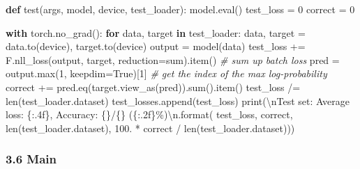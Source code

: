 \documentclass[
]{article}
\newenvironment{Shaded}{}{}
\newcommand{\BuiltInTok}[1]{#1}
\newcommand{\CharTok}[1]{\textcolor[rgb]{0.25,0.44,0.63}{#1}}
\newcommand{\CommentTok}[1]{\textcolor[rgb]{0.38,0.63,0.69}{\textit{#1}}}
\newcommand{\ControlFlowTok}[1]{\textcolor[rgb]{0.00,0.44,0.13}{\textbf{#1}}}
\newcommand{\DecValTok}[1]{\textcolor[rgb]{0.25,0.63,0.44}{#1}}
\newcommand{\FloatTok}[1]{\textcolor[rgb]{0.25,0.63,0.44}{#1}}
\newcommand{\KeywordTok}[1]{\textcolor[rgb]{0.00,0.44,0.13}{\textbf{#1}}}
\newcommand{\NormalTok}[1]{#1}
\newcommand{\OperatorTok}[1]{\textcolor[rgb]{0.40,0.40,0.40}{#1}}
\newcommand{\SpecialCharTok}[1]{\textcolor[rgb]{0.25,0.44,0.63}{#1}}
\newcommand{\StringTok}[1]{\textcolor[rgb]{0.25,0.44,0.63}{#1}}
\newcommand{\VariableTok}[1]{\textcolor[rgb]{0.10,0.09,0.49}{#1}}
\begin{document}
\begin{Shaded}
\begin{Highlighting}[]
\KeywordTok{def}\NormalTok{ test(args, model, device, test\_loader):}
\NormalTok{    model.}\BuiltInTok{eval}\NormalTok{()}
\NormalTok{    test\_loss }\OperatorTok{=} \DecValTok{0}
\NormalTok{    correct }\OperatorTok{=} \DecValTok{0}

    \ControlFlowTok{with}\NormalTok{ torch.no\_grad():}
        \ControlFlowTok{for}\NormalTok{ data, target }\KeywordTok{in}\NormalTok{ test\_loader:}
\NormalTok{            data, target }\OperatorTok{=}\NormalTok{ data.to(device), target.to(device)}
\NormalTok{            output }\OperatorTok{=}\NormalTok{ model(data)}
\NormalTok{            test\_loss }\OperatorTok{+=}\NormalTok{ F.nll\_loss(output, target, reduction}\OperatorTok{=}\StringTok{\textquotesingle{}sum\textquotesingle{}}\NormalTok{).item() }\CommentTok{\# sum up batch loss}
\NormalTok{            pred }\OperatorTok{=}\NormalTok{ output.}\BuiltInTok{max}\NormalTok{(}\DecValTok{1}\NormalTok{, keepdim}\OperatorTok{=}\VariableTok{True}\NormalTok{)[}\DecValTok{1}\NormalTok{] }\CommentTok{\# get the index of the max log{-}probability}
\NormalTok{            correct }\OperatorTok{+=}\NormalTok{ pred.eq(target.view\_as(pred)).}\BuiltInTok{sum}\NormalTok{().item()}
\NormalTok{    test\_loss }\OperatorTok{/=} \BuiltInTok{len}\NormalTok{(test\_loader.dataset)}
\NormalTok{    test\_losses.append(test\_loss)}
    \BuiltInTok{print}\NormalTok{(}\StringTok{\textquotesingle{}}\CharTok{\textbackslash{}n}\StringTok{Test set: Average loss: }\SpecialCharTok{\{:.4f\}}\StringTok{, Accuracy: }\SpecialCharTok{\{\}}\StringTok{/}\SpecialCharTok{\{\}}\StringTok{ (}\SpecialCharTok{\{:.2f\}}\StringTok{\%)}\CharTok{\textbackslash{}n}\StringTok{\textquotesingle{}}\NormalTok{.}\BuiltInTok{format}\NormalTok{(}
\NormalTok{        test\_loss, correct, }\BuiltInTok{len}\NormalTok{(test\_loader.dataset),}
        \FloatTok{100.} \OperatorTok{*}\NormalTok{ correct }\OperatorTok{/} \BuiltInTok{len}\NormalTok{(test\_loader.dataset)))}
  
\end{Highlighting}
\end{Shaded}

\hypertarget{header-n67}{%
\subsubsection{3.6 Main}\label{header-n67}}
\end{document}
